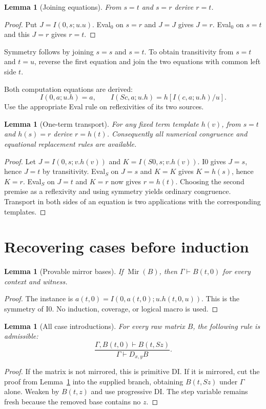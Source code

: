 \documentclass[11pt]{article}
\newtheorem{lemma}[theorem]{Lemma}
\theoremstyle{definition}\newtheorem{definition}[theorem]{Definition}
\newcommand{\Mir}{\operatorname{Mir}}
\begin{document}
\begin{lemma}[Joining equations]\label{lem:join}
From $s=t$ and $s=r$ derive $r=t$.
\end{lemma}
\begin{proof}
Put $J=I(0,s;u.u)$. Eval$_0$ on $s=r$ and $J=J$ gives $J=r$.
Eval$_0$ on $s=t$ and this $J=r$ gives $r=t$.
\end{proof}

Symmetry follows by joining $s=s$ and $s=t$. To obtain transitivity
from $s=t$ and $t=u$, reverse the first equation and join the two
equations with common left side $t$.

Both computation equations are derived:
\[
 I(0,a;u.h)=a,
 \qquad I(Sc,a;u.h)=h[I(c,a;u.h)/u].             \tag{I0, IS}
\]
Use the appropriate Eval rule on reflexivities of its two sources.

\begin{lemma}[One-term transport]\label{lem:transport}
For any fixed term template $h(v)$, from $s=t$ and $h(s)=r$ derive
$r=h(t)$. Consequently all numerical congruence and equational
replacement rules are available.
\end{lemma}
\begin{proof}
Let $J=I(0,s;v.h(v))$ and $K=I(S0,s;v.h(v))$.
I0 gives $J=s$, hence $J=t$ by transitivity. Eval$_S$ on $J=s$ and
$K=K$ gives $K=h(s)$, hence $K=r$. Eval$_S$ on $J=t$ and $K=r$
now gives $r=h(t)$. Choosing the second premise as a reflexivity and
using symmetry yields ordinary congruence. Transport in both sides of
an equation is two applications with the corresponding templates.
\end{proof}

\section{Recovering cases before induction}

\begin{lemma}[Provable mirror bases]\label{lem:base}
If $\Mir(B)$, then $\Gamma\vdash B(t,0)$ for every context and witness.
\end{lemma}
\begin{proof}
The instance is $a(t,0)=I(0,a(t,0);u.h(t,0,u))$. This is the symmetry
of I0. No induction, coverage, or logical macro is used.
\end{proof}

\begin{lemma}[All case introductions]\label{lem:allcases}
For every raw matrix $B$, the following rule is admissible:
\[
 \frac{\Gamma,B(t,0)\vdash B(t,Sz)}
      {\Gamma\vdash D_{x,y}B}.
\]
\end{lemma}
\begin{proof}
If the matrix is not mirrored, this is primitive DI. If it is mirrored,
cut the proof from Lemma~\ref{lem:base} into the supplied branch, obtaining
$B(t,Sz)$ under $\Gamma$ alone. Weaken by $B(t,z)$ and use progressive
DI. The step variable remains fresh because the removed base contains
no $z$.
\end{proof}
\end{document}

